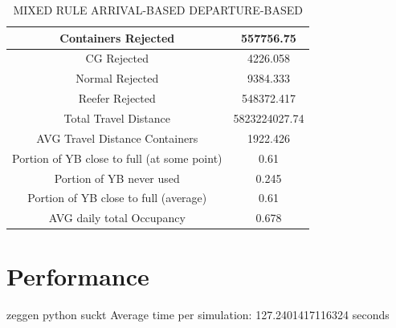\documentclass{article}
\begin{document}
\begin{table}[h]
    \centering
    \begin{tabular}{|c|c|}
        \hline
        Containers Rejected                         & 557756.75     \\ \hline
        CG Rejected                                 & 4226.058      \\ \hline
        Normal Rejected                             & 9384.333      \\ \hline
        Reefer Rejected                             & 548372.417    \\ \hline
        Total Travel Distance                       & 5823224027.74 \\ \hline
        AVG Travel Distance Containers              & 1922.426      \\ \hline
        Portion of YB close to full (at some point) & 0.61          \\ \hline
        Portion of YB never used                    & 0.245         \\ \hline
        Portion of YB close to full (average)       & 0.61          \\ \hline
        AVG daily total Occupancy                   & 0.678         \\ \hline
    \end{tabular}
    \caption{MIXED RULE ARRIVAL-BASED DEPARTURE-BASED}
\end{table}

\section{Performance}\label{sec:performance}

zeggen python suckt Average time per simulation: 127.2401417116324 seconds
\end{document}
